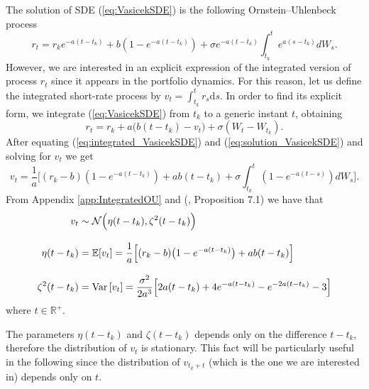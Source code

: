 The solution of \gls{SDE} (\ref{eq:VasicekSDE}) is the following Ornstein–Uhlenbeck process
\begin{equation}\label{eq:solution_VasicekSDE}
r_t = r_ke^{-a(t-t_k)}+b(1-e^{-a(t-t_k)}) + \sigma e^{-a(t-t_k)}\int_{t_k}^{t}e^{a(s-t_k)}dW_s.
\end{equation}
However, we are interested in an explicit expression of the integrated version of process $r_t$ since it appears in the portfolio dynamics. For this reason, let us define the integrated short-rate process by $v_t=\int_{t_k}^{t}r_s\mathrm{d}s$. In order to find its explicit form, we integrate (\ref{eq:VasicekSDE}) from $t_k$ to a generic instant $t$, obtaining
\begin{equation}\label{eq:integrated_VasicekSDE}
r_t = r_k + a\big(b(t-t_k) - v_t\big) + \sigma(W_t-W_{t_k}).
\end{equation}
After equating (\ref{eq:integrated_VasicekSDE}) and (\ref{eq:solution_VasicekSDE}) and solving for $v_t$ we get
\begin{equation}\label{eq:v_t}
v_t = \frac{1}{a}\Big[(r_k-b)(1-e^{-a(t-t_k)})+ab(t-t_k)+\sigma\int_{t_k}^{t}(1-e^{-a(t-s)})dW_s\Big].
\end{equation}
From Appendix \ref{app:IntegratedOU} and (\cite{baldi2017}, Proposition 7.1) we have that
\begin{align}
\nonumber
v_t & \sim \mathcal{N}\Big(\eta(t-t_k),\zeta^2(t-t_k)\Big)\\[2ex]
\label{eq:Vasicek_mean}
\eta(t-t_k) & = \mathbb{E}[v_t]= \frac{1}{a}\Big[(r_k - b)\big(1-e^{-a(t-t_k)}\big)+ab(t-t_k)\Big]\\[2ex]
\label{eq:Vasicek_variance}
\zeta^2(t-t_k) & = \operatorname{Var}\left[v_t\right]= \frac{\sigma^2}{2a^3}\Big[2a(t-t_k) + 4e^{-a(t-t_k)}-e^{-2a(t-t_k)}-3\Big]
\end{align}
where $t \in \mathbb{R}^{+}$.
\begin{remark}
	The parameters $\eta(t-t_k)$ and $\zeta(t-t_k)$ depends only on the difference $t-t_k$, therefore the distribution of $v_t$ is stationary. This fact will be particularly useful in the following since the distribution of $v_{t_k+t}$ (which is the one we are interested in) depends only on $t$.
\end{remark}
